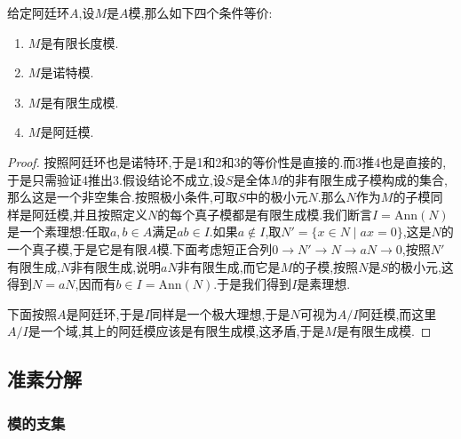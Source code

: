 给定阿廷环$A$,设$M$是$A$模,那么如下四个条件等价:
\begin{enumerate}
	\item $M$是有限长度模.
	\item $M$是诺特模.
	\item $M$是有限生成模.
	\item $M$是阿廷模.
\end{enumerate}
\begin{proof}
	
	按照阿廷环也是诺特环,于是1和2和3的等价性是直接的.而3推4也是直接的,于是只需验证4推出3.假设结论不成立,设$S$是全体$M$的非有限生成子模构成的集合,那么这是一个非空集合.按照极小条件,可取$S$中的极小元$N$.那么$N$作为$M$的子模同样是阿廷模,并且按照定义$N$的每个真子模都是有限生成模.我们断言$I=\mathrm{Ann}(N)$是一个素理想:任取$a,b\in A$满足$ab\in I$.如果$a\not\in I$,取$N'=\{x\in N\mid ax=0\}$,这是$N$的一个真子模,于是它是有限$A$模.下面考虑短正合列$0\to N'\to N\to aN\to0$,按照$N'$有限生成,$N$非有限生成,说明$aN$非有限生成,而它是$M$的子模,按照$N$是$S$的极小元,这得到$N=aN$,因而有$b\in I=\mathrm{Ann}(N)$.于是我们得到$I$是素理想.
	
	下面按照$A$是阿廷环,于是$I$同样是一个极大理想,于是$N$可视为$A/I$阿廷模,而这里$A/I$是一个域,其上的阿廷模应该是有限生成模,这矛盾,于是$M$是有限生成模.
\end{proof}
\newpage
\subsection{准素分解}
\subsubsection{模的支集}

